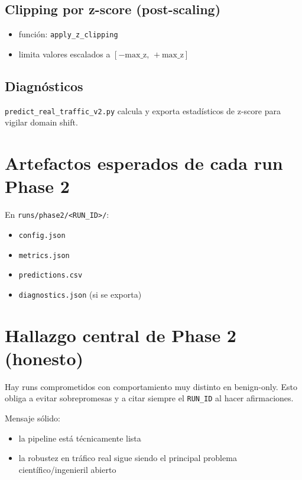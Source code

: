 ﻿\documentclass[12pt,a4paper]{article}
\begin{document}
\subsection{Clipping por z-score (post-scaling)}

\begin{itemize}
  \item función: \verb|apply_z_clipping|
  \item limita valores escalados a \([-\text{max\_z},\, +\text{max\_z}]\)
\end{itemize}

\subsection{Diagnósticos}

\verb|predict_real_traffic_v2.py| calcula y exporta estadísticos de z-score para vigilar domain
shift.

\section{Artefactos esperados de cada run Phase 2}

En \verb|runs/phase2/<RUN_ID>/|:

\begin{itemize}
  \item \texttt{config.json}
  \item \texttt{metrics.json}
  \item \texttt{predictions.csv}
  \item \texttt{diagnostics.json} (si se exporta)
\end{itemize}

\section{Hallazgo central de Phase 2 (honesto)}

Hay runs comprometidos con comportamiento muy distinto en benign-only. Esto obliga a evitar
sobrepromesas y a citar siempre el \texttt{RUN\_ID} al hacer afirmaciones.

Mensaje sólido:

\begin{itemize}
  \item la pipeline está técnicamente lista
  \item la robustez en tráfico real sigue siendo el principal problema científico/ingenieril abierto
\end{itemize}
\end{document}

